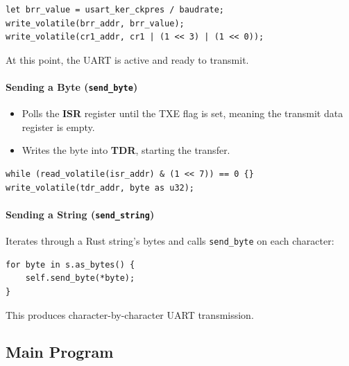 \documentclass[12pt,a4paper]{article}
\begin{document}
\begin{lstlisting}[caption={UART Initialization}, label={lst: uart-init}]
let brr_value = usart_ker_ckpres / baudrate;
write_volatile(brr_addr, brr_value);
write_volatile(cr1_addr, cr1 | (1 << 3) | (1 << 0));
\end{lstlisting}

At this point, the UART is active and ready to transmit.

\paragraph{Sending a Byte (\texttt{send\_byte})}
\begin{itemize}
    \item Polls the \textbf{ISR} register until the TXE flag is set, meaning the transmit data register is empty.
    \item Writes the byte into \textbf{TDR}, starting the transfer.
\end{itemize}

\begin{lstlisting}[caption={Sending a Byte}, label={lst: send-byte}]
while (read_volatile(isr_addr) & (1 << 7)) == 0 {}
write_volatile(tdr_addr, byte as u32);
\end{lstlisting}

\paragraph{Sending a String (\texttt{send\_string})}
Iterates through a Rust string's bytes and calls \texttt{send\_byte} on each character:

\begin{lstlisting}[caption={Sending a String}, label={lst: send-string}]
for byte in s.as_bytes() {
    self.send_byte(*byte);
}
\end{lstlisting}

This produces character-by-character UART transmission.

\subsection{Main Program}
\end{document}
